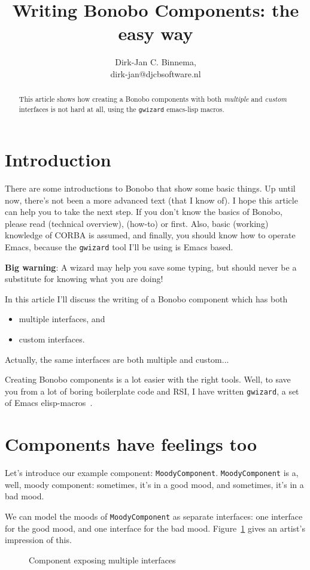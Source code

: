 \documentclass[final,10pt]{article}
\title{Writing Bonobo Components: the easy way}
\author{Dirk-Jan C. Binnema, 
  {\link{http://www.djcbsoftware.nl}}\\
  dirk-jan@djcbsoftware.nl}
\newcommand{\gwizard}{{\tt gwizard}}
\begin{document}
\maketitle
\begin{abstract}
  This article shows how creating a Bonobo components with
  both {\em multiple} and {\em custom} interfaces is not hard at all,
  using the \gwizard{} emacs-lisp macros.
\end{abstract}

\section{Introduction}
There are some introductions to Bonobo that show some basic
things. Up until now, there's not been a more advanced text 
(that I know of). I hope
this article can help you to take the next step. If you don't know
the basics of Bonobo, please read \cite{bonobo-nluug} (technical overview),
\cite{ipctrl} (how-to) or \cite{meeks1} first. Also, basic
(working) knowledge of CORBA is assumed, and finally, you should know
how to operate Emacs, because the \verb|gwizard| tool I'll be using is
Emacs based.

{\bf Big warning}: A wizard may help you save some typing, but should never be a
substitute for knowing what you are doing!

In this article I'll discuss the writing of a Bonobo component which has both
\begin{itemize}
        \item multiple interfaces, and 
        \item custom interfaces. 
\end{itemize}
Actually, the same interfaces are both multiple and custom... 

Creating Bonobo components is a lot easier with the right tools. Well,
to save you from a lot of boring boilerplate code and RSI, I have
written \verb|gwizard|, a set of Emacs elisp-macros~\cite{gwizard}.

\section{Components have feelings too}
Let's introduce our example component: \verb|MoodyComponent|. 
\verb|MoodyComponent| is a, well, moody component: 
sometimes, it's in a good mood, and sometimes, it's in a bad mood.

We can model the moods of \verb|MoodyComponent| as separate
interfaces: one interface for the good mood, and one interface for the
bad mood. Figure~\ref{fig:moody-component} gives an artist's
impression of this.
\begin{figure}[ht]
  \centerline{%
    \epsfxsize=80mm
    }
  \caption{Component exposing multiple interfaces}
  {\label{fig:moody-component}}
\end{figure}
\end{document}
